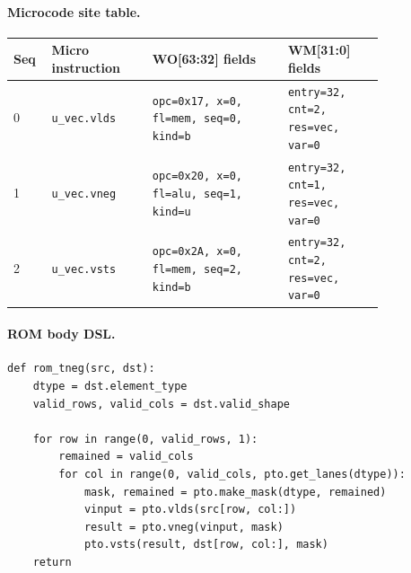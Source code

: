 \paragraph{Microcode site table.}
{\scriptsize
\begin{longtable}{@{}R{0.055\linewidth}L{0.23\linewidth}L{0.31\linewidth}L{0.22\linewidth}@{}}
\toprule
Seq & Micro instruction & WO[63:32] fields & WM[31:0] fields \\
 & \texttt{u\_vec.vlds} & \texttt{opc=0x17, x=0, fl=mem, seq=0, kind=b} & \texttt{entry=32, cnt=2, res=vec, var=0} \\
1 & \texttt{u\_vec.vneg} & \texttt{opc=0x20, x=0, fl=alu, seq=1, kind=u} & \texttt{entry=32, cnt=1, res=vec, var=0} \\
2 & \texttt{u\_vec.vsts} & \texttt{opc=0x2A, x=0, fl=mem, seq=2, kind=b} & \texttt{entry=32, cnt=2, res=vec, var=0} \\
\bottomrule
\end{longtable}
}
\paragraph{ROM body DSL.}
\begin{lstlisting}[style=ptocode]
def rom_tneg(src, dst):
    dtype = dst.element_type
    valid_rows, valid_cols = dst.valid_shape

    for row in range(0, valid_rows, 1):
        remained = valid_cols
        for col in range(0, valid_cols, pto.get_lanes(dtype)):
            mask, remained = pto.make_mask(dtype, remained)
            vinput = pto.vlds(src[row, col:])
            result = pto.vneg(vinput, mask)
            pto.vsts(result, dst[row, col:], mask)
    return
\end{lstlisting}
\Needspace{0.34\textheight}

